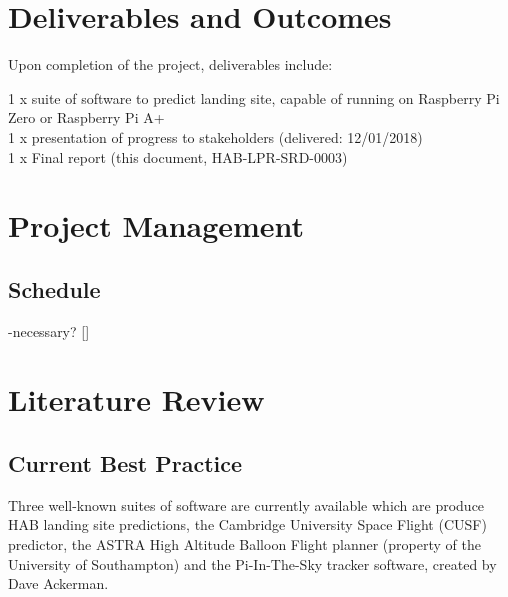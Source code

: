 \documentclass[11pt]{article}
\begin{document}
\FloatBarrier

\section{Deliverables and Outcomes}
Upon completion of the project, deliverables include:

1 x suite of software to predict landing site, capable of running on Raspberry Pi Zero or Raspberry Pi A+ \\
1 x presentation of progress to stakeholders (delivered: 12/01/2018) \\
1 x Final report (this document, HAB-LPR-SRD-0003)\\

\section{Project Management}



\subsection{Schedule}

-necessary? []


\section{Literature Review}

\subsection{Current Best Practice} \label{sec:existing}

Three well-known suites of software are currently available which are produce HAB landing site predictions, the Cambridge University Space Flight (CUSF) predictor, the ASTRA High Altitude Balloon Flight planner (property of the University of Southampton) and the Pi-In-The-Sky tracker software, created by Dave Ackerman. \\
\end{document}
